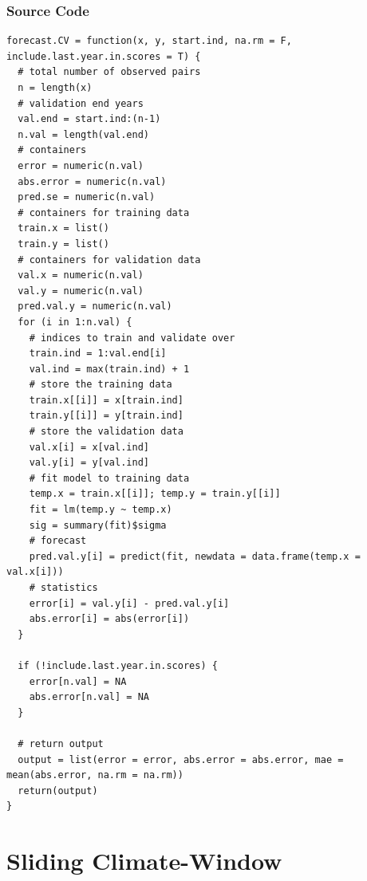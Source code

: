 \documentclass[12pt,]{book}
\theoremstyle{definition}
\theoremstyle{definition}
\theoremstyle{definition}
\theoremstyle{remark}
\begin{document}
\subsubsection*{Source Code}\label{source-code}

\begin{singlespace}
\begin{verbatim}
forecast.CV = function(x, y, start.ind, na.rm = F, include.last.year.in.scores = T) {  
  # total number of observed pairs
  n = length(x)
  # validation end years
  val.end = start.ind:(n-1)
  n.val = length(val.end)
  # containers
  error = numeric(n.val)
  abs.error = numeric(n.val)
  pred.se = numeric(n.val)
  # containers for training data
  train.x = list()
  train.y = list()
  # containers for validation data
  val.x = numeric(n.val)
  val.y = numeric(n.val)
  pred.val.y = numeric(n.val)
  for (i in 1:n.val) {
    # indices to train and validate over
    train.ind = 1:val.end[i]
    val.ind = max(train.ind) + 1
    # store the training data
    train.x[[i]] = x[train.ind]
    train.y[[i]] = y[train.ind]
    # store the validation data
    val.x[i] = x[val.ind]
    val.y[i] = y[val.ind]
    # fit model to training data
    temp.x = train.x[[i]]; temp.y = train.y[[i]]
    fit = lm(temp.y ~ temp.x)
    sig = summary(fit)$sigma
    # forecast
    pred.val.y[i] = predict(fit, newdata = data.frame(temp.x = val.x[i]))
    # statistics
    error[i] = val.y[i] - pred.val.y[i]
    abs.error[i] = abs(error[i])
  }
  
  if (!include.last.year.in.scores) {
    error[n.val] = NA
    abs.error[n.val] = NA
  } 
  
  # return output
  output = list(error = error, abs.error = abs.error, mae = mean(abs.error, na.rm = na.rm))
  return(output)
}
\end{verbatim}
\end{singlespace}

\section*{Sliding Climate-Window}\label{sliding-climate-window}

\setlength{\parskip}{6pt plus 2pt minus 1pt}


\end{document}
